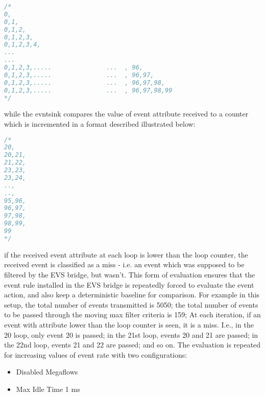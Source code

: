 \begin{lstlisting}[language=c]
/*
0,
0,1,
0,1,2,
0,1,2,3,
0,1,2,3,4,
...
...
0,1,2,3,.....               ...  , 96,
0,1,2,3,.....               ...  , 96,97,
0,1,2,3,.....               ...  , 96,97,98,
0,1,2,3,.....               ...  , 96,97,98,99
*/
\end{lstlisting}

while the evntsink compares the value of event attribute received to a counter which is incremented in a format described illustrated below:
\begin{lstlisting}[language=c]
/*
20,
20,21,
21,22,
23,23,
23,24,
..,
..,
95,96,
96,97,
97,98,
98,99,
99  
*/
\end{lstlisting}
if the received event attribute at each loop is lower than the loop counter, the received event is classified as a miss - i.e. an event which was supposed to be filtered by the EVS bridge, but wasn't. This form of evaluation ensures that the event rule installed in the EVS bridge is repeatedly forced to evaluate the event action, and also keep a deterministic baseline for comparison. For example in this setup, the total number of events transmitted is 5050; the total number of events to be passed through the moving max filter criteria is 159; At each iteration, if an event with attribute lower than the loop counter is seen, it is a miss. I.e., in the 20 loop, only event 20 is passed; in the 21st loop, events 20 and 21 are passed; in the 22nd loop, events 21 and 22 are passed; and so on. The evaluation is repeated for increasing values of event rate with two configurations:
\begin{itemize}
	\item Disabled Megaflows
	\item Max Idle Time 1 ms
\end{itemize}

\delaydata




